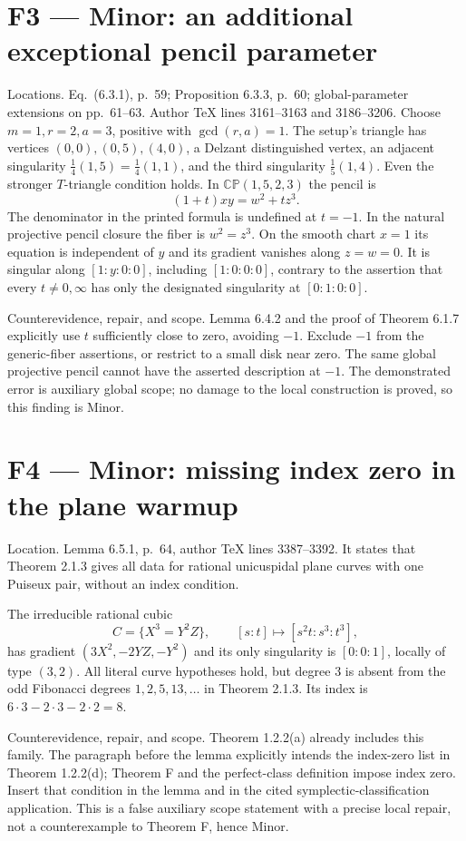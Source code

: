 \documentclass[10pt]{article}
\begin{document}
\section*{F3 — Minor: an additional exceptional pencil parameter}
Locations. Eq. (6.3.1), p. 59; Proposition 6.3.3, p. 60; global-parameter extensions on pp. 61–63. Author TeX lines 3161–3163 and 3186–3206. Choose \(m=1,r=2,a=3\), positive with \(\gcd(r,a)=1\). The setup’s triangle has vertices \((0,0),(0,5),(4,0)\), a Delzant distinguished vertex, an adjacent singularity \(\frac14(1,5)=\frac14(1,1)\), and the third singularity \(\frac15(1,4)\). Even the stronger \(T\)-triangle condition holds. In \(\mathbb{CP}(1,5,2,3)\) the pencil is \[(1+t)xy=w^2+t z^3.\] The denominator in the printed formula is undefined at \(t=-1\). In the natural projective pencil closure the fiber is \(w^2=z^3\). On the smooth chart \(x=1\) its equation is independent of \(y\) and its gradient vanishes along \(z=w=0\). It is singular along \([1:y:0:0]\), including \([1:0:0:0]\), contrary to the assertion that every \(t\ne0,\infty\) has only the designated singularity at \([0:1:0:0]\).\par
Counterevidence, repair, and scope. Lemma 6.4.2 and the proof of Theorem 6.1.7 explicitly use \(t\) sufficiently close to zero, avoiding \(-1\). Exclude \(-1\) from the generic-fiber assertions, or restrict to a small disk near zero. The same global projective pencil cannot have the asserted description at \(-1\). The demonstrated error is auxiliary global scope; no damage to the local construction is proved, so this finding is Minor.\par
\section*{F4 — Minor: missing index zero in the plane warmup}
Location. Lemma 6.5.1, p. 64, author TeX lines 3387–3392. It states that Theorem 2.1.3 gives all data for rational unicuspidal plane curves with one Puiseux pair, without an index condition.\par
The irreducible rational cubic \[C=\{X^3=Y^2Z\},\qquad [s:t]\mapsto[s^2t:s^3:t^3],\] has gradient \((3X^2,-2YZ,-Y^2)\) and its only singularity is \([0:0:1]\), locally of type \((3,2)\). All literal curve hypotheses hold, but degree \(3\) is absent from the odd Fibonacci degrees \(1,2,5,13,\ldots\) in Theorem 2.1.3. Its index is \(6\cdot3-2\cdot3-2\cdot2=8\).\par
Counterevidence, repair, and scope. Theorem 1.2.2(a) already includes this family. The paragraph before the lemma explicitly intends the index-zero list in Theorem 1.2.2(d); Theorem F and the perfect-class definition impose index zero. Insert that condition in the lemma and in the cited symplectic-classification application. This is a false auxiliary scope statement with a precise local repair, not a counterexample to Theorem F, hence Minor.\par
\end{document}
